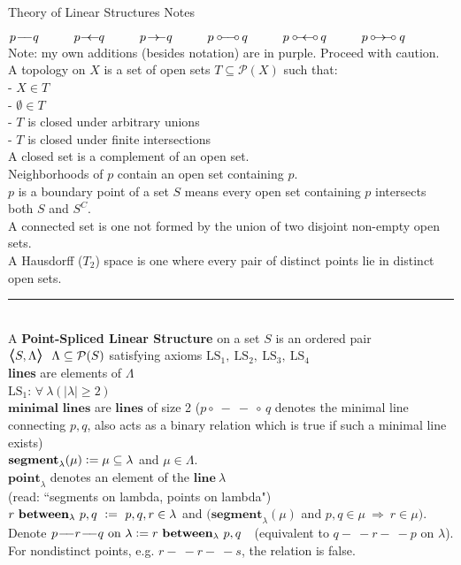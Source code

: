 \documentclass{article}
\newcommand{\hsp}[1][5]{\hspace{0.#1 cm}}
\newcommand{\hcm}[1][1]{\hspace{#1 cm}}
\newcommand{\bra}[1][1.2]{\scalebox{#1}{$\boldsymbol{\langle}$}}
\newcommand{\nl}[1][12]{\\[#1pt]}
\newcommand{\ket}[1][1.2]{\scalebox{#1}{$\boldsymbol{\rangle}$}}
\newcommand{\imp}{\ \Rightarrow\ }
\newcommand{\defeq}{\vcentcolon=}
\newcommand{\ch}[1]{\text{#1}}
\newcommand {\chb}[1]{\textbf{#1}}
\newcommand{\seg}{\!-\!\!\!\!\:-}
\newcommand{\lseg}{-\!\!\!\leftarrow\!\!}
\newcommand{\rseg}{\!\rightarrow\!\!\!-}
\newcommand{\adj}{\circ\!\!\!\:\seg\!\!\!\!\:\circ\,}
\newcommand{\ladj}{\circ\!\!\!\!\:\lseg\!\!\:\circ\,}
\newcommand{\radj}{\,\circ\!\!\!\:\rseg\!\!\!\!\:\circ}
\begin{document}
\begin{center}
Theory of Linear Structures Notes
\end{center}
\begin{flushleft}
\hangindent=1.1cm 
$p\seg q\hcm p \lseg q \hcm p\rseg q \hcm p \adj q \hcm p\ladj q \hcm p\radj q$\\
Note: my own additions (besides notation) are in {\color{purple} purple}. Proceed with caution.\nl[6]
A topology on $X$ is a set of open sets $T\subseteq \mathcal{P}(X)$ such that:\nl[6]
 - $X \in T$\\
 - $\emptyset \in T$\\
 - $T$ is closed under arbitrary unions\\
 - $T$ is closed under finite intersections\nl[6]
A closed set is a complement of an open set.\\
Neighborhoods of $p$ contain an open set containing $p$.\\
$p$ is a boundary point of a set $S$ means every open set containing $p$ intersects both $S$ and $S^C$.\\
A connected set is one not formed by the union of two disjoint non-empty open sets.\\
A Hausdorff ($T_2$) space is one where every pair of distinct points lie in distinct open sets.\nl[7]

\par\noindent\rule{\textwidth}{0.4pt}\nl[5] %

A \chb{Point-Spliced Linear Structure} on a set $S$ is an ordered pair $\bra S, \Lambda \ket\ \ \Lambda \subseteq \mathcal{P}(S)$ satisfying axioms $\ch{LS}_1,\ \ch{LS}_2,\ \ch{LS}_3,\ \ch{LS}_4$\nl[6]
\hsp[2]\textbf{lines} are elements of $\Lambda$\nl[12]

$\ch{LS}_1$: $\forall\ \lambda\ \big(\ |\lambda|\geq 2\ \big)$\nl[6]\hsp[2]
$\chb{minimal lines}$ are $\chb{lines}$ of size 2 ($p\adj q$ denotes the minimal line connecting $p,q$, also acts as a binary relation which is true if such a minimal line exists) \\\hsp[2]
$\chb{segment}_\lambda(\mu) \defeq \mu \subseteq \lambda$ and $\mu \in \Lambda$.\\\hsp[2]
$\chb{point}_\lambda$ denotes an element of the $\chb{line}\ \lambda $\\\hsp[2]
(read: ``segments on lambda, points on lambda")\nl[6]
\hsp[2] $r\  \chb{between}_\lambda\ p,q \ \defeq \ p,q,r \in \lambda$ and $ \Big( \chb{segment}_\lambda(\mu)$ and $p,q \in \mu \imp r \in \mu \Big)$.\\
\hsp[2] Denote $p \seg r \seg q \ch{ on }\lambda \defeq r\ \chb{between}_\lambda\ p,q\ \ $ (equivalent to $q \seg r \seg p$ on $\lambda$).\\
\hsp[2] For nondistinct points, e.g. $r\seg r\seg s$, the relation is false.\nl[12]


\end{flushleft}
\end{document}
